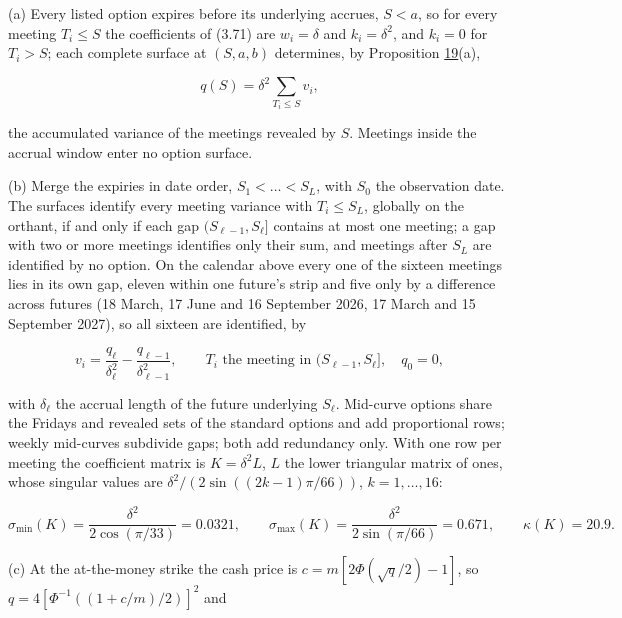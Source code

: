 \documentclass[11pt]{article}
\begin{document}
(a) Every listed option expires before its underlying accrues, \(S < a\), so for every meeting \(T_i \le S\) the coefficients of (3.71) are \(w_i = \delta\) and \(k_i = \delta^2\), and \(k_i = 0\) for \(T_i > S\); each complete surface at \((S, a, b)\) determines, by Proposition \hyperref[res:Proposition-19]{19}(a),

\begin{equation*}
q(S) = \delta^2 \sum_{T_i \le S} v_i, \tag{3.104}\label{eq:3.104}
\end{equation*}

the accumulated variance of the meetings revealed by \(S\). Meetings inside the accrual window enter no option surface.

(b) Merge the expiries in date order, \(S_1 < \dots < S_L\), with \(S_0\) the observation date. The surfaces identify every meeting variance with \(T_i \le S_L\), globally on the orthant, if and only if each gap \((S_{\ell-1}, S_\ell]\) contains at most one meeting; a gap with two or more meetings identifies only their sum, and meetings after \(S_L\) are identified by no option. On the calendar above every one of the sixteen meetings lies in its own gap, eleven within one future's strip and five only by a difference across futures (18 March, 17 June and 16 September 2026, 17 March and 15 September 2027), so all sixteen are identified, by

\begin{equation*}
v_i = \frac{q_\ell}{\delta_\ell^2} - \frac{q_{\ell-1}}{\delta_{\ell-1}^2}, \qquad T_i \text{ the meeting in } (S_{\ell-1}, S_\ell], \quad q_0 = 0, \tag{3.105}\label{eq:3.105}
\end{equation*}

with \(\delta_\ell\) the accrual length of the future underlying \(S_\ell\). Mid-curve options share the Fridays and revealed sets of the standard options and add proportional rows; weekly mid-curves subdivide gaps; both add redundancy only. With one row per meeting the coefficient matrix is \(K = \delta^2 L\), \(L\) the lower triangular matrix of ones, whose singular values are \(\delta^2 / (2\sin((2k-1)\pi/66))\), \(k = 1, \dots, 16\):

\begin{equation*}
\sigma_{\min}(K) = \frac{\delta^2}{2\cos(\pi/33)} = 0.0321, \qquad \sigma_{\max}(K) = \frac{\delta^2}{2\sin(\pi/66)} = 0.671, \qquad \kappa(K) = 20.9. \tag{3.106}\label{eq:3.106}
\end{equation*}

(c) At the at-the-money strike the cash price is \(c = m[2\Phi(\sqrt q / 2) - 1]\), so \(q = 4[\Phi^{-1}((1 + c/m)/2)]^2\) and
\end{document}
